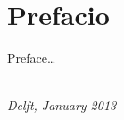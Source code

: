 \chapter*{Prefacio}

Preface\ldots

\begin{flushright}
{\makeatletter\itshape
    \@author \\
    Delft, January 2013
\makeatother}
\end{flushright}

